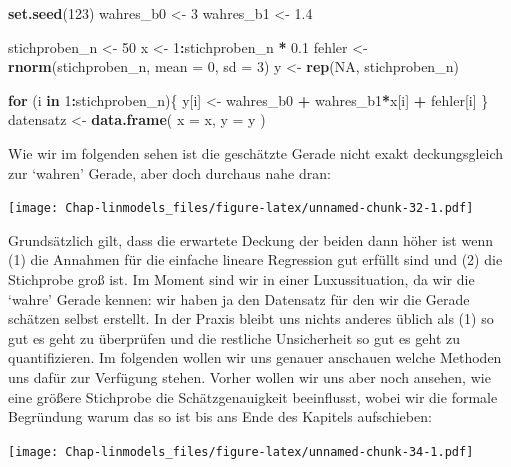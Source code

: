 \documentclass[]{book}
\newenvironment{Shaded}{\begin{snugshade}}{\end{snugshade}}
\newcommand{\KeywordTok}[1]{\textcolor[rgb]{0.13,0.29,0.53}{\textbf{#1}}}
\newcommand{\DataTypeTok}[1]{\textcolor[rgb]{0.13,0.29,0.53}{#1}}
\newcommand{\DecValTok}[1]{\textcolor[rgb]{0.00,0.00,0.81}{#1}}
\newcommand{\FloatTok}[1]{\textcolor[rgb]{0.00,0.00,0.81}{#1}}
\newcommand{\StringTok}[1]{\textcolor[rgb]{0.31,0.60,0.02}{#1}}
\newcommand{\OtherTok}[1]{\textcolor[rgb]{0.56,0.35,0.01}{#1}}
\newcommand{\ControlFlowTok}[1]{\textcolor[rgb]{0.13,0.29,0.53}{\textbf{#1}}}
\newcommand{\OperatorTok}[1]{\textcolor[rgb]{0.81,0.36,0.00}{\textbf{#1}}}
\newcommand{\NormalTok}[1]{#1}
\begin{document}
\begin{Shaded}
\begin{Highlighting}[]
\KeywordTok{set.seed}\NormalTok{(}\DecValTok{123}\NormalTok{)}
\NormalTok{wahres_b0 <-}\StringTok{ }\DecValTok{3}
\NormalTok{wahres_b1 <-}\StringTok{ }\FloatTok{1.4}

\NormalTok{stichproben_n <-}\StringTok{ }\DecValTok{50}
\NormalTok{x <-}\StringTok{ }\DecValTok{1}\OperatorTok{:}\NormalTok{stichproben_n }\OperatorTok{*}\StringTok{ }\FloatTok{0.1}
\NormalTok{fehler <-}\StringTok{ }\KeywordTok{rnorm}\NormalTok{(stichproben_n, }\DataTypeTok{mean =} \DecValTok{0}\NormalTok{, }\DataTypeTok{sd =} \DecValTok{3}\NormalTok{)}
\NormalTok{y <-}\StringTok{ }\KeywordTok{rep}\NormalTok{(}\OtherTok{NA}\NormalTok{, stichproben_n)}

\ControlFlowTok{for}\NormalTok{ (i }\ControlFlowTok{in} \DecValTok{1}\OperatorTok{:}\NormalTok{stichproben_n)\{}
\NormalTok{  y[i] <-}\StringTok{ }\NormalTok{wahres_b0 }\OperatorTok{+}\StringTok{ }\NormalTok{wahres_b1}\OperatorTok{*}\NormalTok{x[i] }\OperatorTok{+}\StringTok{ }\NormalTok{fehler[i]}
\NormalTok{\}}
\NormalTok{datensatz <-}\StringTok{ }\KeywordTok{data.frame}\NormalTok{(}
  \DataTypeTok{x =}\NormalTok{ x,}
  \DataTypeTok{y =}\NormalTok{ y}
\NormalTok{)}
\end{Highlighting}
\end{Shaded}

Wie wir im folgenden sehen ist die geschätzte Gerade nicht exakt
deckungsgleich zur `wahren' Gerade, aber doch durchaus nahe dran:

\texttt{[image: Chap-linmodels\_files/figure-latex/unnamed-chunk-32-1.pdf]}

Grundsätzlich gilt, dass die erwartete Deckung der beiden dann höher ist
wenn (1) die Annahmen für die einfache lineare Regression gut erfüllt
sind und (2) die Stichprobe groß ist. Im Moment sind wir in einer
Luxussituation, da wir die `wahre' Gerade kennen: wir haben ja den
Datensatz für den wir die Gerade schätzen selbst erstellt. In der Praxis
bleibt uns nichts anderes üblich als (1) so gut es geht zu überprüfen
und die restliche Unsicherheit so gut es geht zu quantifizieren. Im
folgenden wollen wir uns genauer anschauen welche Methoden uns dafür zur
Verfügung stehen. Vorher wollen wir uns aber noch ansehen, wie eine
größere Stichprobe die Schätzgenauigkeit beeinflusst, wobei wir die
formale Begründung warum das so ist bis ans Ende des Kapitels
aufschieben:

\texttt{[image: Chap-linmodels\_files/figure-latex/unnamed-chunk-34-1.pdf]}
\end{document}
